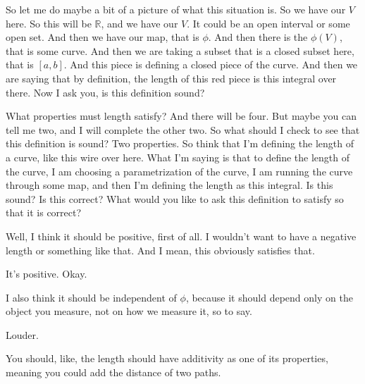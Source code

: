 \begin{spoken-clean}[07:25 - 08:38]
So let me do maybe a bit of a picture of what this situation is. So we have our $V$ here. So this will be $\mathbb{R}$, and we have our $V$. It could be an open interval or some open set. And then we have our map, that is $\phi$. And then there is the $\phi(V)$, that is some curve. And then we are taking a subset that is a closed subset here, that is $[a,b]$. And this piece is defining a closed piece of the curve. And then we are saying that by definition, the length of this red piece is this integral over there. Now I ask you, is this definition sound?
\end{spoken-clean}

\begin{spoken-clean}[08:38 - 10:20]
What properties must length satisfy? And there will be four. But maybe you can tell me two, and I will complete the other two. So what should I check to see that this definition is sound? Two properties. So think that I'm defining the length of a curve, like this wire over here. What I'm saying is that to define the length of the curve, I am choosing a parametrization of the curve, I am running the curve through some map, and then I'm defining the length as this integral. Is this sound? Is this correct? What would you like to ask this definition to satisfy so that it is correct?
\end{spoken-clean}

\begin{student-question}
Well, I think it should be positive, first of all. I wouldn't want to have a negative length or something like that. And I mean, this obviously satisfies that.
\end{student-question}

\begin{spoken-clean}[continued]
It's positive. Okay.
\end{spoken-clean}

\begin{student-question}
I also think it should be independent of $\phi$, because it should depend only on the object you measure, not on how we measure it, so to say.
\end{student-question}

\begin{spoken-clean}[continued]
Louder.
\end{spoken-clean}

\begin{student-question}
You should, like, the length should have additivity as one of its properties, meaning you could add the distance of two paths.
\end{student-question}

